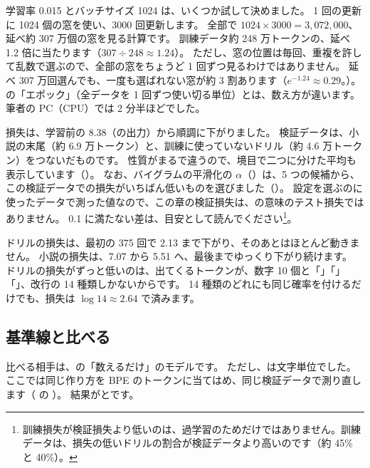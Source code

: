 学習率 0.015 とバッチサイズ 1024 は、いくつか試して決めました。
1 回の更新に 1024 個の窓を使い、3000 回更新します。
全部で $1024\times3000=3{,}072{,}000$、延べ約 307 万個の窓を見る計算です。
訓練データ約 248 万トークンの、延べ 1.2 倍に当たります（$307\div248\approx1.24$）。
ただし、窓の位置は毎回、重複を許して乱数で選ぶので、全部の窓をちょうど 1 回ずつ見るわけではありません。
延べ 307 万回選んでも、一度も選ばれない窓が約 3 割あります（$e^{-1.24}\approx0.29$。）。
の「エポック」（全データを 1 回ずつ使い切る単位）とは、数え方が違います。
筆者の PC（CPU）では 2 分半ほどでした。


損失は、学習前の 8.38（の出力）から順調に下がりました。
検証データは、小説の末尾（約 6.9 万トークン）と、訓練に使っていないドリル（約 4.6 万トークン）をつないだものです。
性質がまるで違うので、境目で二つに分けた平均も表示しています（）。
なお、バイグラムの平滑化の $\alpha$（）は、5 つの候補から、この検証データでの損失がいちばん低いものを選びました（）。
設定を選ぶのに使ったデータで測った値なので、この章の検証損失は、の意味のテスト損失ではありません。
0.1 に満たない差は、目安として読んでください\footnote{訓練損失が検証損失より低いのは、過学習のためだけではありません。訓練データは、損失の低いドリルの割合が検証データより高いのです（約 45\% と 40\%）。}。

ドリルの損失は、最初の 375 回で 2.13 まで下がり、そのあとはほとんど動きません。
小説の損失は、7.07 から 5.51 へ、最後までゆっくり下がり続けます。
ドリルの損失がずっと低いのは、出てくるトークンが、数字 10 個と「\code{+}」「\code{-}」「\code{=}」、改行の 14 種類しかないからです。
14 種類のどれにも同じ確率を付けるだけでも、損失は $\log 14\approx2.64$ で済みます。

\subsection*{基準線と比べる}

比べる相手は、の「数えるだけ」のモデルです。
ただし、は文字単位でした。
ここでは同じ作り方を BPE のトークンに当てはめ、同じ検証データで測り直します（ の ）。
結果がとです。

